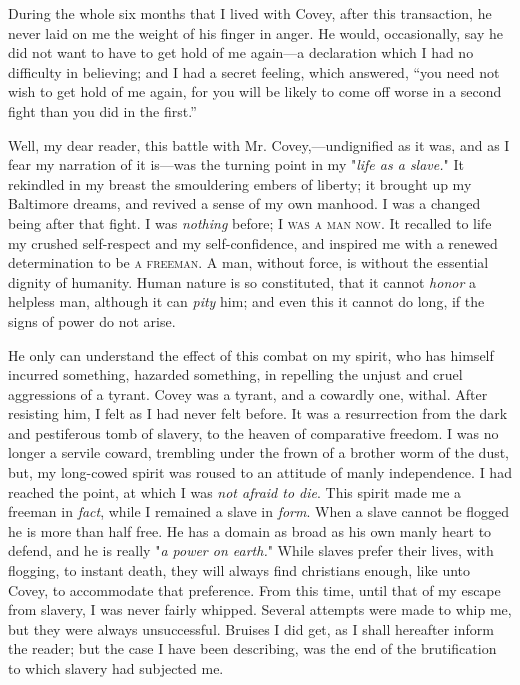 During the whole six months that I lived with Covey, after this
transaction, he never laid on me the weight of his finger in anger. He
would, occasionally, say he did not want to have to get hold of me
again---a declaration which I had no difficulty in believing; and I had
a secret feeling, which answered, ``you need not wish to get hold of me
again, for you will be likely to come off worse in a second fight than
you did in the first.''

Well, my dear reader, this battle with Mr. Covey,---undignified as it
was, and as I fear my narration of it is---was the turning point in my
"\emph{life as a slave.}" It rekindled in my breast the smouldering
embers of liberty; it brought up my Baltimore dreams, and revived a
sense of my own manhood. I was a changed being after that fight. I was
\emph{nothing} before; I \textsc{was a man now}. It recalled to life my
crushed self-respect and my self-confidence, and inspired me with a
renewed determination to be \textsc{a freeman}. A man, {}without force,
is without the essential dignity of humanity. Human nature is so
constituted, that it cannot \emph{honor} a helpless man, although it can
\emph{pity} him; and even this it cannot do long, if the signs of power
do not arise.

He only can understand the effect of this combat on my spirit, who has
himself incurred something, hazarded something, in repelling the unjust
and cruel aggressions of a tyrant. Covey was a tyrant, and a cowardly
one, withal. After resisting him, I felt as I had never felt before. It
was a resurrection from the dark and pestiferous tomb of slavery, to the
heaven of comparative freedom. I was no longer a servile coward,
trembling under the frown of a brother worm of the dust, but, my
long-cowed spirit was roused to an attitude of manly independence. I had
reached the point, at which I was \emph{not afraid to die}. This spirit
made me a freeman in \emph{fact}, while I remained a slave in
\emph{form}. When a slave cannot be flogged he is more than half free.
He has a domain as broad as his own manly heart to defend, and he is
really "\emph{a power on earth.}" While slaves prefer their lives, with
flogging, to instant death, they will always find christians enough,
like unto Covey, to accommodate that preference. From this time, until
that of my escape from slavery, I was never fairly whipped. Several
attempts were made to whip me, but they were always unsuccessful.
Bruises I did get, as I shall hereafter inform the reader; but the case
I have been describing, was the end of the brutification to which
slavery had subjected me.

